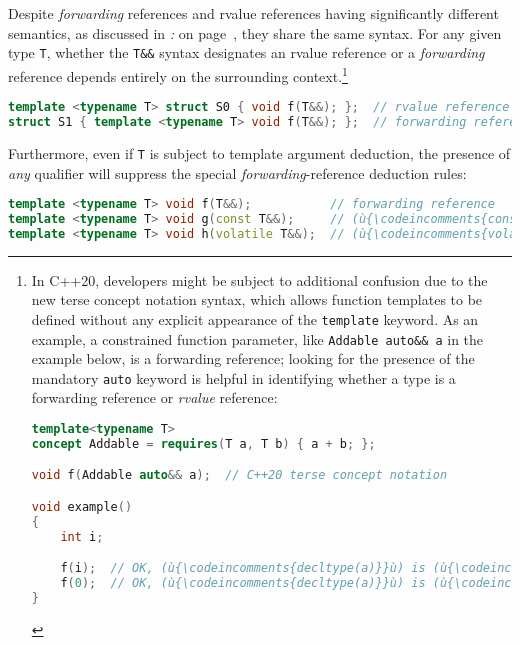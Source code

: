 Despite \emph{forwarding} references and rvalue
references having significantly different semantics, as discussed in \textit{: } on page~\pageref{identifying-forwarding-references}, they share the same syntax. For any given type \texttt{T},
whether the \texttt{T\&\&} syntax designates an rvalue
reference or a \emph{forwarding} reference depends entirely on the
surrounding context.{\cprotect\footnote{In C++20, developers might be
subject to additional confusion due to the new terse concept notation
syntax, which allows function templates to be defined without any
explicit appearance of the \texttt{template} keyword. As an example, a
constrained function parameter, like
\texttt{Addable}~\texttt{auto\&\&}~\texttt{a} in the example below, is a forwarding
reference; looking for the presence of the mandatory \texttt{auto}
keyword is helpful in identifying whether a type is a forwarding
reference or \emph{rvalue} reference:

\begin{lstlisting}[language=C++, basicstyle={\ttfamily\footnotesize}]
template<typename T>
concept Addable = requires(T a, T b) { a + b; };

void f(Addable auto&& a);  // C++20 terse concept notation

void example()
{
    int i;

    f(i);  // OK, (ù{\codeincomments{decltype(a)}}ù) is (ù{\codeincomments{int\&}}ù) in (ù{\codeincomments{f}}ù).
    f(0);  // OK, (ù{\codeincomments{decltype(a)}}ù) is (ù{\codeincomments{int\&\&}}ù) in (ù{\codeincomments{f}}ù).
}
\end{lstlisting}
      }}

\begin{lstlisting}[language=C++]
template <typename T> struct S0 { void f(T&&); };  // rvalue reference
struct S1 { template <typename T> void f(T&&); };  // forwarding reference
\end{lstlisting}

\noindent Furthermore, even if \texttt{T} is subject to template argument
deduction, the presence of \emph{any} qualifier will suppress the
special \emph{forwarding}-reference deduction rules:

\begin{lstlisting}[language=C++]
template <typename T> void f(T&&);           // forwarding reference
template <typename T> void g(const T&&);     // (ù{\codeincomments{const}}ù) rvalue reference
template <typename T> void h(volatile T&&);  // (ù{\codeincomments{volatile}}ù) rvalue reference
\end{lstlisting}

